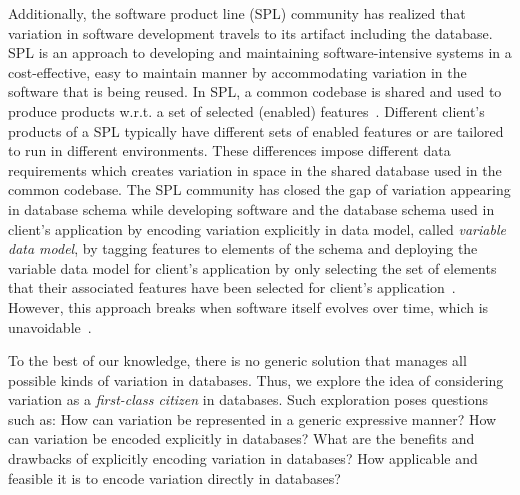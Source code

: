 Additionally, the software product line (SPL) community has realized that 
variation in software development travels to its artifact including the database.
%
SPL is an
approach to developing and maintaining software-intensive systems 
in a cost-effective, easy to maintain manner by accommodating variation
in the software that is being reused. 
%
In SPL, a common codebase is shared and used to produce products w.r.t.
a set of selected (enabled) features~\cite{splBook}. 
%
Different client's products of a SPL typically have different
sets of enabled features or are tailored to run in different environments. These
differences impose different data requirements which creates variation in space 
in the shared database used in the common codebase. 
%
The SPL community has closed
the gap of variation appearing in database schema while developing software
and the database schema used in client's application by
encoding variation explicitly in data model, called \emph{variable data model},
by tagging features to elements of the schema and deploying the variable
data model for client's application by only selecting the set of elements that 
their associated features have been selected for client's application~\cite{skrhas09DBIS, slrs12CAiSE, 
ad11varDataModel}. 
However, this approach breaks when software itself evolves over time, 
which is unavoidable~\cite{dbSPLevolve}.

To the best of our knowledge, 
there is no generic solution that manages all possible kinds of
variation in databases. Thus, we explore the idea of considering
variation as a \emph{first-class citizen} in databases. Such exploration
poses questions such as: How can variation be represented in a generic
expressive manner? How can variation be encoded explicitly in databases?
What are the benefits and drawbacks of explicitly encoding variation in 
databases? How applicable and feasible it is to encode variation 
directly in databases?

